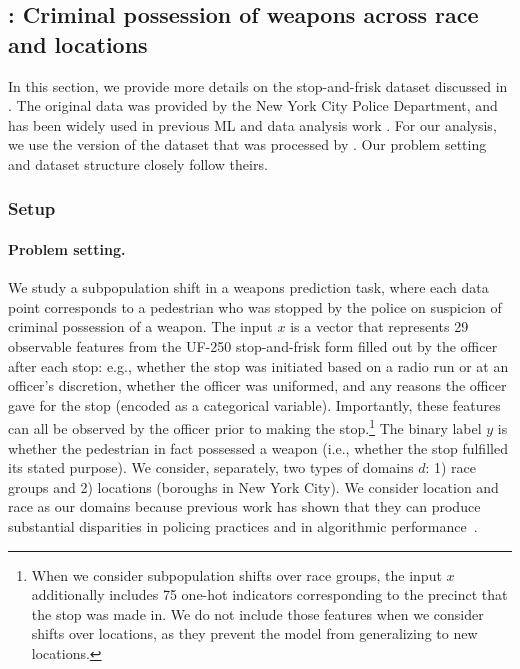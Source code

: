 \subsection{\SQF: Criminal possession of weapons across race and locations}\label{sec:app_sqf}

In this section, we provide more details on the stop-and-frisk dataset discussed in .
The original data was provided by the New York City Police Department, and has been widely used in previous ML and data analysis work \citep{goel_precinct_2016, zafar_parity_2017,
pierson_fast_2018, kallus_residual_2018, srivastava_robustness_2020}.
For our analysis, we use the version of the dataset that was processed by  \citet{goel_precinct_2016}. Our problem setting and dataset structure closely follow theirs.

\subsubsection{Setup}

\paragraph{Problem setting.} We study a subpopulation shift in a weapons prediction task, where each data point corresponds to a pedestrian who was stopped by the police on suspicion of criminal possession of a weapon. The input $x$ is a vector that represents 29 observable features from the UF-250 stop-and-frisk form filled out by the officer after each stop: e.g., whether the stop was initiated based on a radio run or at an officer's discretion, whether the officer was uniformed, and any reasons the officer gave for the stop (encoded as a categorical variable). Importantly, these features can all be observed by the officer prior to making the stop.\footnote{%
  When we consider subpopulation shifts over race groups, the input $x$ additionally includes 75 one-hot indicators corresponding to the precinct that the stop was made in.
  We do not include those features when we consider shifts over locations,
  as they prevent the model from generalizing to new locations.
}
The binary label $y$ is whether the pedestrian in fact possessed a weapon (i.e., whether the stop fulfilled its stated purpose).
We consider, separately, two types of domains $d$: 1) race groups and 2) locations (boroughs in New York City). We consider location and race as our domains because previous work has shown that they can produce substantial disparities in policing practices and in algorithmic performance~\citep{goel_precinct_2016}.

